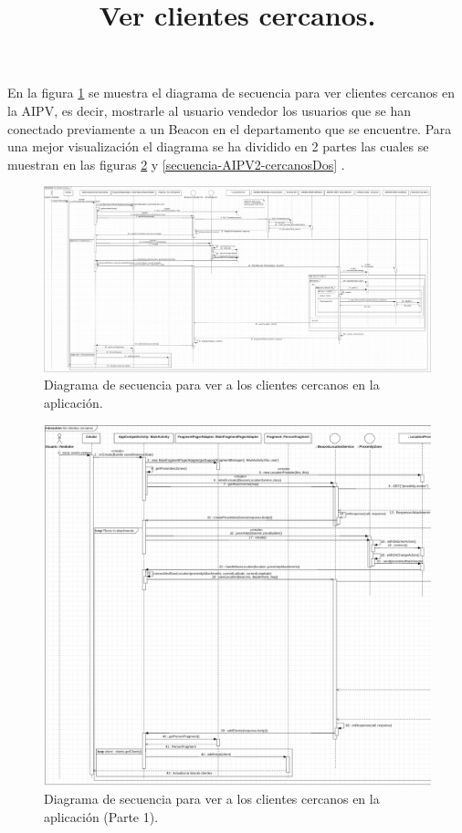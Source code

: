 \title{\textbf{Ver clientes cercanos.}\\}

En la figura \ref{secuencia-AIPV2-cercanos} se muestra el diagrama de secuencia para ver clientes cercanos en la AIPV, es decir, mostrarle al usuario vendedor los usuarios que se han conectado previamente a un Beacon en el departamento que se encuentre. Para una mejor visualización el diagrama se ha dividido en 2 partes las cuales se muestran en las figuras \ref{secuencia-AIPV2-cercanosUno} y \ref{secuencia-AIPV2-cercanosDos} .

\FloatBarrier
\begin{figure}[htbp!]
		\centering
			\includegraphics[width=1 \textwidth]{imagenes/adrian/vendedor/prototipo2/clientes_cercanos}
		\caption{Diagrama de secuencia para ver a los clientes cercanos en la aplicación.}
		\label{secuencia-AIPV2-cercanos}
\end{figure}
\FloatBarrier

\FloatBarrier
\begin{figure}[htbp!]
		\centering
			\includegraphics[width=1 \textwidth]{imagenes/adrian/vendedor/prototipo2/clientes_cercanos_1}
		\caption{Diagrama de secuencia para ver a los clientes cercanos en la aplicación (Parte 1).}
		\label{secuencia-AIPV2-cercanosUno}
\end{figure}
\FloatBarrier

